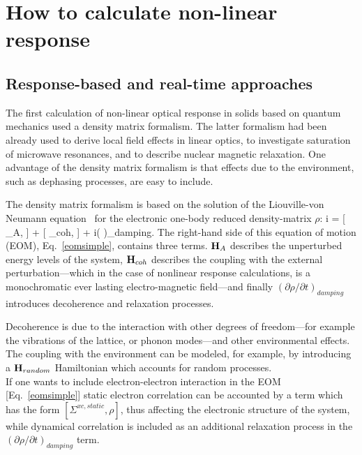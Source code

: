 \section{How to calculate non-linear response}
\subsection{Response-based and real-time approaches}
The first calculation of non-linear optical response in solids based on quantum mechanics used a density matrix formalism.\cite{bloembergen1964quantum} The latter formalism had been already used to derive local field effects in linear optics\cite{PhysRev.126.413,wiser1963dielectric}, to investigate  saturation of microwave resonances\cite{karplus1948note}, and to describe nuclear magnetic relaxation\cite{kubo1954general,RevModPhys.33.249,PhysRev.102.104}. One advantage of the density matrix formalism is that effects due to the environment, such as dephasing processes, are easy to include.\cite{manzano2020short}

The density matrix formalism is based on the solution of the Liouville-von Neumann equation~\cite{neumann} for the electronic one-body reduced density-matrix $\rho$:
\be
i \hbar {} = [ \HH_A, \rho] + [ \HH_{coh}, \rho] + i\hbar \left (  \right )_{damping}.
\label{eomsimple}
\ee
The right-hand side of this equation of motion (EOM), Eq.~\ref{eomsimple}, contains three terms. ${\bf H}_A$ describes the unperturbed energy levels of the system, ${\bf H}_{coh}$ describes the coupling with the external perturbation---which in the case of nonlinear response calculations, is a monochromatic ever lasting electro-magnetic field---and finally $\left ( \partial \rho/\partial t \right )_{damping}$ introduces decoherence and relaxation processes.

Decoherence is due to the interaction with other degrees of freedom---for example the vibrations of the lattice, or phonon modes---and other environmental effects. The coupling with the environment can be modeled, for example, by introducing a ${\bf H}_{random}$ Hamiltonian which accounts for random processes.\cite{manzano2020short}\\
If one wants to include electron-electron interaction  in the EOM [Eq.~\ref{eomsimple}] static electron correlation can be accounted by a term which has the form $[\Sigma^{xc,static},\rho]$, thus affecting the electronic structure of the system, while dynamical correlation is included as an additional relaxation process in the $\left ( \partial \rho/\partial t \right )_{damping}$ term.

